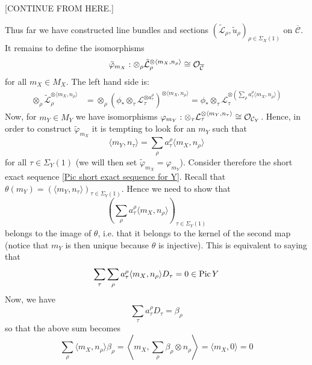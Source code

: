 [CONTINUE FROM HERE.]

Thus far we have constructed line bundles and sections $(\tilde{\mathcal L}_\rho, \tilde{u}_\rho)_{\rho \in \Sigma_X(1)}$ on $\overline{\mathcal C}$. It remains to define the isomorphisms
\begin{equation*} \tilde{\varphi}_{m_X} : \otimes_\rho \tilde{\mathcal L}_\rho^{\otimes \langle m_X, n_\rho \rangle} \cong \mathcal{O}_{\overline{\mathcal C}} \end{equation*}
for all $m_X \in M_X$. The left hand side is:
\begin{align*} \otimes_\rho \tilde{\mathcal L}_\rho^{\otimes \langle m_X, n_\rho \rangle} & = \otimes_\rho \left( \phi_* \otimes_\tau \mathcal L_\tau^{\otimes a_\tau^\rho} \right)^{\otimes \langle m_X, n_\rho \rangle} = \phi_* \otimes_\tau \mathcal L_\tau^{\otimes \left( \sum_{\rho} a_\tau^\rho  \langle m_X, n_\rho \rangle \right)} \end{align*}
Now, for $m_Y \in M_Y$ we have isomorphisms $\varphi_{m_Y} : \otimes_\tau \mathcal L_\tau^{\otimes \langle m_Y, n_\tau \rangle} \cong \mathcal{O}_{\mathcal C_Y}$. Hence, in order to construct $\tilde{\varphi}_{m_X}$ it is tempting to look for an $m_Y$ such that
\begin{equation*} \langle m_Y, n_\tau \rangle = \sum_\rho a_\tau^\rho \langle m_X, n_\rho \rangle \end{equation*}
for all $\tau \in \Sigma_Y(1)$ (we will then set $\tilde{\varphi}_{m_X} = \varphi_{m_Y}$). Consider therefore the short exact sequence \eqref{Pic short exact sequence for Y}. Recall that $\theta(m_Y) = (\langle m_Y, n_\tau \rangle)_{\tau \in \Sigma_Y(1)}$. Hence we need to show that
\begin{equation*} \left( \sum_\rho a_\tau^\rho \langle m_X, n_\rho \rangle \right)_{\tau \in \Sigma_Y(1)} \end{equation*}
belongs to the image of $\theta$, i.e. that it belongs to the kernel of the second map (notice that $m_Y$ is then unique because $\theta$ is injective). This is equivalent to saying that
\begin{equation*} \sum_\tau \sum_\rho a_\tau^\rho \langle m_X, n_\rho \rangle D_\tau = 0 \in \operatorname{Pic} Y \end{equation*}
Now, we have
\begin{equation*} \sum_\tau a_\tau^\rho D_\tau = \beta_\rho \end{equation*}
so that the above sum becomes
\begin{equation*} \sum_\rho \langle m_X, n_\rho \rangle \beta_\rho = \left\langle m_X, \sum_\rho \beta_\rho \otimes n_\rho \right \rangle = \langle m_X, 0 \rangle = 0 \end{equation*}
